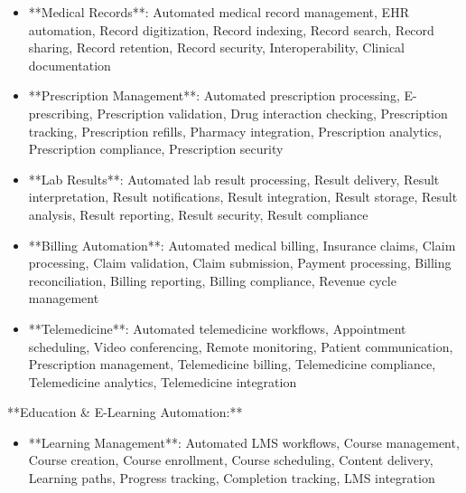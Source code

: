 \documentclass[11pt,a4paper]{article}
\begin{document}
\begin{itemize}
\item **Medical Records**: Automated medical record management, EHR automation, Record digitization, Record indexing, Record search, Record sharing, Record retention, Record security, Interoperability, Clinical documentation
\end{itemize}

\begin{itemize}
\item **Prescription Management**: Automated prescription processing, E-prescribing, Prescription validation, Drug interaction checking, Prescription tracking, Prescription refills, Pharmacy integration, Prescription analytics, Prescription compliance, Prescription security
\end{itemize}

\begin{itemize}
\item **Lab Results**: Automated lab result processing, Result delivery, Result interpretation, Result notifications, Result integration, Result storage, Result analysis, Result reporting, Result security, Result compliance
\end{itemize}

\begin{itemize}
\item **Billing Automation**: Automated medical billing, Insurance claims, Claim processing, Claim validation, Claim submission, Payment processing, Billing reconciliation, Billing reporting, Billing compliance, Revenue cycle management
\end{itemize}

\begin{itemize}
\item **Telemedicine**: Automated telemedicine workflows, Appointment scheduling, Video conferencing, Remote monitoring, Patient communication, Prescription management, Telemedicine billing, Telemedicine compliance, Telemedicine analytics, Telemedicine integration
\end{itemize}

**Education \& E-Learning Automation:**

\begin{itemize}
\item **Learning Management**: Automated LMS workflows, Course management, Course creation, Course enrollment, Course scheduling, Content delivery, Learning paths, Progress tracking, Completion tracking, LMS integration
\end{itemize}
\end{document}
